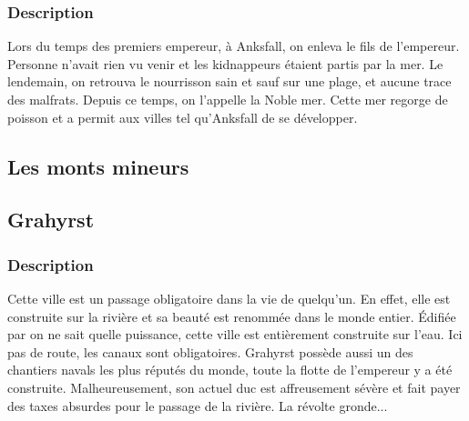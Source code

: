 \subsubsection{Description}
\hypertarget{lanoblemer}{}Lors du temps des premiers empereur, à Anksfall, on enleva le fils de l'empereur.
Personne n'avait rien vu venir et les kidnappeurs étaient partis par la mer. 
Le lendemain, on retrouva le nourrisson sain  et sauf sur une plage, et aucune trace des malfrats.
Depuis ce temps, on l'appelle la Noble mer.
Cette mer regorge de poisson et a permit aux villes tel qu'Anksfall de se développer.
\subsection{Les monts mineurs}
\subsection{Grahyrst}
\subsubsection{Description}
\hypertarget {grahyrst}{}Cette ville est un passage obligatoire dans la vie de quelqu’un. En effet, elle est construite sur la rivière et sa beauté est renommée dans le monde entier. Édifiée par on ne sait quelle puissance, cette ville est entièrement construite sur l’eau. Ici pas de route, les canaux sont obligatoires. Grahyrst possède aussi un des chantiers navals les plus réputés du monde, toute la flotte de l’empereur y a été construite. Malheureusement, son actuel duc est affreusement sévère et fait payer des taxes absurdes pour le passage de la rivière. La révolte gronde...
